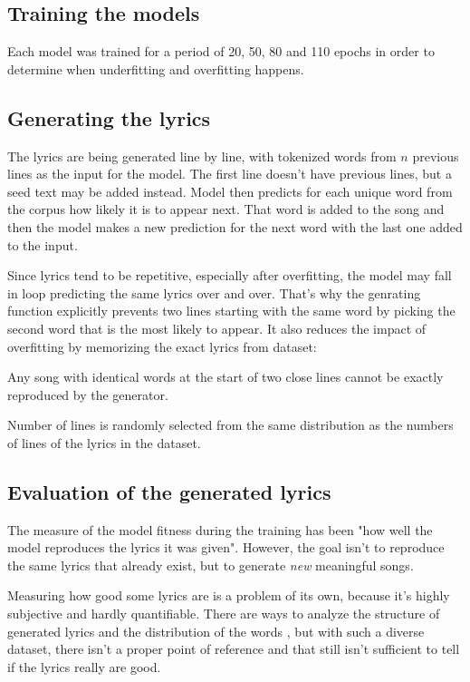\documentclass[conference]{IEEEtran}
\begin{document}
\subsection{Training the models}
Each model was trained for a period of 20, 50, 80 and 110 epochs in order to determine when underfitting and overfitting happens. 

\subsection{Generating the lyrics}
The lyrics are being generated line by line, with tokenized words from $n$
previous lines as the input for the model. The first line doesn't have previous
lines, but a seed text may be added instead. Model then predicts for each unique
word from the corpus how likely it is to appear next. That word is added to
the song and then the model makes a new prediction for the next word with the
last one added to the input.

Since lyrics tend to be repetitive, especially after overfitting, the model may
fall in loop predicting the same lyrics over and over. That's why the
genrating function explicitly prevents two lines starting with the same word
by picking the second word that is the most likely to appear. It also reduces
the impact of overfitting by memorizing the exact lyrics from dataset:

Any song with identical words at the start of two close lines cannot be exactly
reproduced by the generator.

Number of lines is randomly selected from the same distribution as the numbers
of lines of the lyrics in the dataset.

\subsection{Evaluation of the generated lyrics}
The measure of the model fitness during the training has been "how well the
model reproduces the lyrics it was given". However, the goal isn't to reproduce
the same lyrics that already exist, but to generate \textit{new} meaningful songs. 

Measuring how good some lyrics are is a problem of its own, because it's highly
subjective and hardly quantifiable. There are ways to analyze the structure of
generated lyrics and the distribution of the words \cite{b7}, but with such a
diverse dataset, there isn't a proper point of reference and that still isn't 
sufficient to tell if the lyrics really are good.
\end{document}
